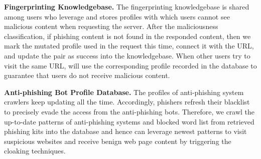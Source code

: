 \noindent
\textbf{Fingerprinting Knowledgebase.}
The fingerprinting knowledgebase is shared among users who leverage \spartacus and stores profiles with which users cannot see malicious content when requesting the server.
After the maliciousness classification, if phishing content is not found in the responded content, then we mark the mutated profile used in the request this time, connect it with the URL, and update the pair as success into the knowledgebase.
When other users try to visit the same URL, \spartacus will use the corresponding profile recorded in the database to guarantee that users do not receive malicious content.

\noindent
\textbf{Anti-phishing Bot Profile Database.}
The profiles of anti-phishing system crawlers keep updating all the time.
Accordingly, phishers refresh their blacklist to precisely evade the access from the anti-phishing bots.
Therefore, we crawl the up-to-date patterns of anti-phishing systems and blocked word list from retrieved phishing kits into the database and hence \spartacus can leverage newest patterns to visit suspicious websites and receive benign web page content by triggering the cloaking techniques.







